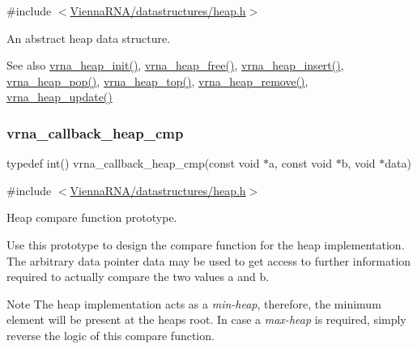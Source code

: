 {\ttfamily \#include $<$\mbox{\hyperlink{heap_8h}{Vienna\+R\+N\+A/datastructures/heap.\+h}}$>$}



An abstract heap data structure. 

\begin{DoxySeeAlso}{See also}
\mbox{\hyperlink{group__heap__utils_gafd02db4841338bad6f551e3e2bd2161f}{vrna\+\_\+heap\+\_\+init()}}, \mbox{\hyperlink{group__heap__utils_ga2a4915c6e66b8831644857df0715c3ce}{vrna\+\_\+heap\+\_\+free()}}, \mbox{\hyperlink{group__heap__utils_ga91cf0042c894de44c4eb7b47707260a8}{vrna\+\_\+heap\+\_\+insert()}}, \mbox{\hyperlink{group__heap__utils_ga3b6242f3a1194eb1df2d1fb40d630610}{vrna\+\_\+heap\+\_\+pop()}}, \mbox{\hyperlink{group__heap__utils_ga534a8483824371019241e340c026111b}{vrna\+\_\+heap\+\_\+top()}}, \mbox{\hyperlink{group__heap__utils_ga5e181d5ef8557d502943b938620c7174}{vrna\+\_\+heap\+\_\+remove()}}, \mbox{\hyperlink{group__heap__utils_gabdd04b8719b3d85c5ad53ed7dec9700b}{vrna\+\_\+heap\+\_\+update()}} 
\end{DoxySeeAlso}
\mbox{\label{group__heap__utils_gac70f1b16e617c57128b1ac9361529795}} 
\subsubsection{\texorpdfstring{vrna\_callback\_heap\_cmp}{vrna\_callback\_heap\_cmp}}
{\footnotesize\ttfamily typedef int() vrna\+\_\+callback\+\_\+heap\+\_\+cmp(const void $\ast$a, const void $\ast$b, void $\ast$data)}



{\ttfamily \#include $<$\mbox{\hyperlink{heap_8h}{Vienna\+R\+N\+A/datastructures/heap.\+h}}$>$}



Heap compare function prototype. 

Use this prototype to design the compare function for the heap implementation. The arbitrary data pointer {\ttfamily data} may be used to get access to further information required to actually compare the two values {\ttfamily a} and {\ttfamily b}.

\begin{DoxyNote}{Note}
The heap implementation acts as a {\itshape min-\/heap}, therefore, the minimum element will be present at the heap\textquotesingle{}s root. In case a {\itshape max-\/heap} is required, simply reverse the logic of this compare function.
\end{DoxyNote}


